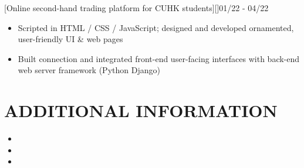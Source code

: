 \documentclass[cmu]{resume}
\begin{document}

    [Online second-hand trading platform for CUHK students][]{01/22 - 04/22}
    \begin{itemize}
        \item Scripted in HTML / CSS / JavaScript; designed and developed ornamented, user-friendly UI \& web pages
        \item Built connection and integrated front-end user-facing interfaces with back-end web server framework (Python Django)
    \end{itemize}
    \section{ADDITIONAL INFORMATION}
    \begin{itemize}
        \item {}
        \item {}
        \item {}
    \end{itemize}
\end{document}
